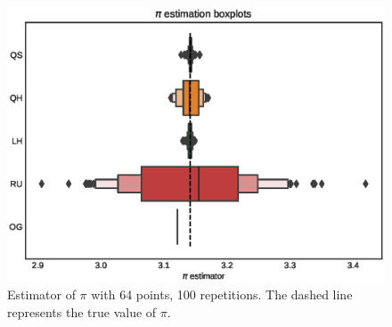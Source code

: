 \documentclass[shortabstract]{iithesis}
\begin{document}
\begin{figure}[!ht]
    \centering
    \includegraphics[scale=0.65]{pi_example_1d.eps}
    \caption{Estimator of $\pi$ with 64 points, 100 repetitions. The dashed line represents the true value of $\pi$.}
    \label{fig:toy:res}
\end{figure}

\newpage
\end{document}
